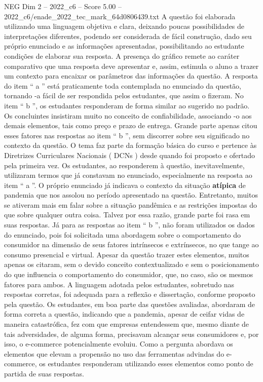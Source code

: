 \begin{textsample}{NEG Dim 2 – 2022\_c6 – Score 5.00 – 2022\_c6/enade\_2022\_tec\_mark\_64d0806439.txt}
A questão foi elaborada utilizando uma linguagem objetiva e clara, deixando poucas possibilidades de interpretações diferentes, podendo ser considerada de fácil construção, dado seu próprio enunciado e as informações apresentadas, possibilitando ao estudante condições de elaborar sua resposta.
A presença do gráfico remete ao caráter comparativo que uma resposta deve apresentar e, assim, estimula o aluno a trazer um contexto para encaixar os parâmetros das informações da questão.
A resposta do item “ a ” está praticamente toda contemplada no enunciado da questão, tornando -a fácil de ser respondida pelos estudantes, que assim o fizeram.
No item “ b ”, os estudantes responderam de forma similar ao sugerido no padrão.
Os concluintes insistiram muito no conceito de confiabilidade, associando -o aos demais elementos, tais como preço e prazo de entrega.
Grande parte apenas citou esses fatores nas respostas ao item “ b ”, sem discorrer sobre seu significado no contexto da questão.
O tema faz parte da formação básica do curso e pertence às Diretrizes Curriculares Nacionais ( DCNs ) desde quando foi proposto e ofertado pela primeira vez.
Os estudantes, ao responderem à questão, inevitavelmente, utilizaram termos que já constavam no enunciado, especialmente na resposta ao item “ a ”.
O próprio enunciado já indicava o contexto da situação \textbf{atípica} de pandemia que nos assolou no período apresentado na questão.
Entretanto, muitos se ativeram mais em falar sobre a situação pandêmica e as restrições impostas do que sobre qualquer outra coisa.
Talvez por essa razão, grande parte foi rasa em suas respostas.
Já para as respostas ao item “ b ”, não foram utilizados os dados do enunciado, pois foi solicitada uma abordagem sobre o comportamento do consumidor na dimensão de seus fatores intrínsecos e extrínsecos, no que tange ao consumo presencial e virtual.
Apesar da questão trazer estes elementos, muitos apenas os citaram, sem o devido conceito contextualizado e sem o posicionamento do que influencia o comportamento do consumidor, que, no caso, são os mesmos fatores para ambos.
A linguagem adotada pelos estudantes, sobretudo nas respostas corretas, foi adequada para a reflexão e dissertação, conforme proposto pela questão.
Os estudantes, em boa parte das questões avaliadas, abordaram de forma correta a questão, indicando que a pandemia, apesar de ceifar vidas de maneira catastrófica, fez com que empresas entendessem que, mesmo diante de tais adversidades, de alguma forma, precisavam alcançar seus consumidores e, por isso, o e-commerce potencialmente evoluiu.
Como a pergunta abordava os elementos que elevam a propensão no uso das ferramentas advindas do e-commerce, os estudantes responderam utilizando esses elementos como ponto de partida de suas respostas.

\end{textsample}
